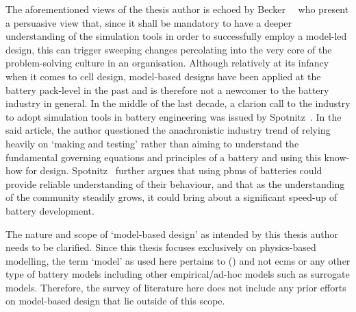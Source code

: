 The   aforementioned    views   of    the   thesis    author   is    echoed   by
Becker~\etal~\cite{Becker2005}  who present  a  persuasive view  that, since  it
shall be  mandatory to have  a deeper understanding  of the simulation  tools in
order  to successfully  employ a  model-led  design, this  can trigger  sweeping
changes percolating  into the  very core  of the  problem-solving culture  in an
organisation. Although relatively  at its infancy when it comes  to cell design,
model-based designs have been applied at  the battery pack-level in the past and
is therefore not a newcomer to the battery industry in general. In the middle of
the last  decade, a clarion  call to the industry  to adopt simulation  tools in
battery  engineering was  issued  by Spotnitz~\cite{Spotnitz2005}.  In the  said
article,  the author  questioned  the anachronistic  industry  trend of  relying
heavily on `making and testing' rather than aiming to understand the fundamental
governing equations  and principles  of a  battery and  using this  know-how for
design. Spotnitz~\cite{Spotnitz2005}  further argues  that using  \glspl{pbm} of
batteries could provide  reliable understanding of their behaviour,  and that as
the  understanding of  the  community steadily  grows, it  could  bring about  a
significant speed-up of battery development.

The nature and  scope of `model-based design' as intended  by this thesis author
needs to  be clarified. Since  this thesis focuses exclusively  on physics-based
modelling,  the  term  `model'  as  used  here  pertains  to  
() and  not \glspl{ecm} or  any other type of  battery models
including other empirical/ad-hoc models such as surrogate models. Therefore, the
survey of  literature here  does not  include any  prior efforts  on model-based
design that lie outside of this scope.

